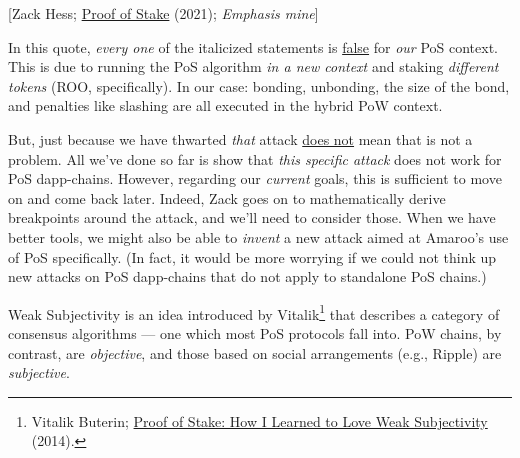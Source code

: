 [Zack Hess; \href{\linkZackPoSCriticisms}{Proof of Stake} (2021); \emph{Emphasis mine}]

In this quote, \emph{every one} of the italicized statements is \ul{false} for \emph{our} PoS context.
This is due to running the PoS algorithm \emph{in a new context} and staking \emph{different tokens} (ROO, specifically).
In our case: bonding, unbonding, the size of the bond, and penalties like slashing are all executed in the hybrid PoW context.

But, just because we have thwarted \emph{that} attack \ul{does not} mean that \ppe is not a problem.
All we've done so far is show that \emph{this specific attack} does not work for PoS dapp-chains.
However, regarding our \emph{current} goals, this is sufficient to move on and come back later.
Indeed, Zack goes on to mathematically derive breakpoints around the attack, and we'll need to consider those.
When we have better tools, we might also be able to \emph{invent} a new attack aimed at Amaroo's use of PoS specifically.
(In fact, it would be more worrying if we could not think up new attacks on PoS dapp-chains that do not apply to standalone PoS chains.)


Weak Subjectivity is an idea introduced by Vitalik\footnote{
    Vitalik Buterin; \href{\linkButerinWeakSubjectivity}{Proof of Stake: How I Learned to Love Weak Subjectivity} (2014).
} that describes a category of consensus algorithms --- one which most PoS protocols fall into.
PoW chains, by contrast, are \emph{objective}, and those based on social arrangements (e.g., Ripple) are \emph{subjective}.

